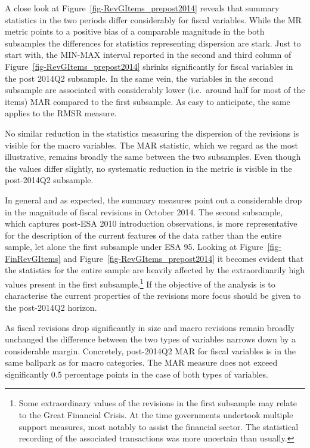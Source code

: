 \documentclass[
  letterpaper,
  authoryear,
  preprint,
  3p]{elsarticle}
\begin{document}
A close look at Figure~\ref{fig-RevGItems_prepost2014} reveals that
summary statistics in the two periods differ considerably for fiscal
variables. While the MR metric points to a positive bias of a comparable
magnitude in the both subsamples the differences for statistics
representing dispersion are stark. Just to start with, the MIN-MAX
interval reported in the second and third column of
Figure~\ref{fig-RevGItems_prepost2014} shrinks significantly for fiscal
variables in the post 2014Q2 subsample. In the same vein, the variables
in the second subsample are associated with considerably lower
(i.e.~around half for most of the items) MAR compared to the first
subsample. As easy to anticipate, the same applies to the RMSR measure.

No similar reduction in the statistics measuring the dispersion of the
revisions is visible for the macro variables. The MAR statistic, which
we regard as the most illustrative, remains broadly the same between the
two subsamples. Even though the values differ slightly, no systematic
reduction in the metric is visible in the post-2014Q2 subsample.

In general and as expected, the summary measures point out a
considerable drop in the magnitude of fiscal revisions in October 2014.
The second subsample, which captures post-ESA 2010 introduction
observations, is more representative for the description of the current
features of the data rather than the entire sample, let alone the first
subsample under ESA 95. Looking at Figure~\ref{fig-FinRevGItems} and
Figure~\ref{fig-RevGItems_prepost2014} it becomes evident that the
statistics for the entire sample are heavily affected by the
extraordinarily high values present in the first subsample.\footnote{Some
  extraordinary values of the revisions in the first subsample may
  relate to the Great Financial Crisis. At the time governments
  undertook multiple support measures, most notably to assist the
  financial sector. The statistical recording of the associated
  transactions was more uncertain than usually.} If the objective of the
analysis is to characterise the current properties of the revisions more
focus should be given to the post-2014Q2 horizon.

As fiscal revisions drop significantly in size and macro revisions
remain broadly unchanged the difference between the two types of
variables narrows down by a considerable margin. Concretely, post-2014Q2
MAR for fiscal variables is in the same ballpark as for macro
categories. The MAR measure does not exceed significantly 0.5 percentage
points in the case of both types of variables.
\end{document}

